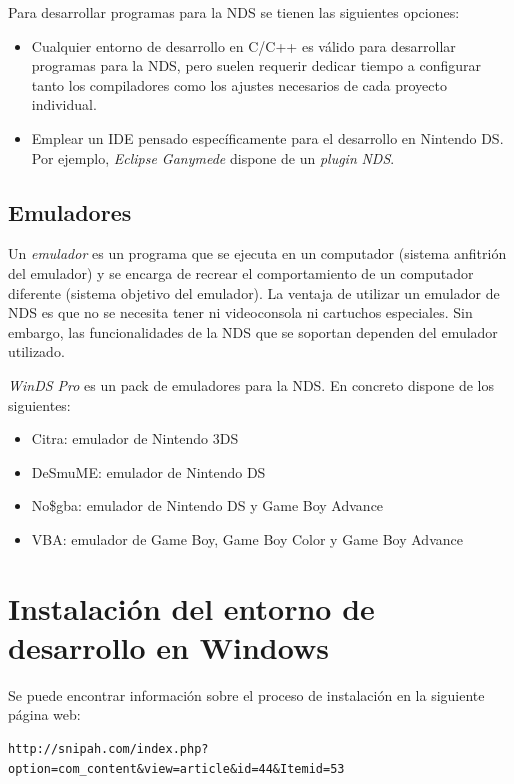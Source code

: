 Para desarrollar programas para la NDS se tienen las siguientes opciones:

\begin{itemize}
\item Cualquier entorno de desarrollo en C/C++ es válido para desarrollar programas para la NDS, pero suelen requerir dedicar tiempo a configurar tanto los compiladores como los ajustes necesarios de cada proyecto individual. 
%
\item Emplear un IDE pensado específicamente para el desarrollo en Nintendo DS. Por ejemplo, \textit{Eclipse Ganymede} dispone de un \textit{plugin} \textit{NDS}. 
\end{itemize}

\subsection{Emuladores}
Un \textit{emulador} es un programa que se ejecuta en un computador (sistema anfitrión del emulador) y se encarga de recrear el comportamiento de un computador diferente (sistema objetivo del emulador). La ventaja de utilizar un emulador de NDS es que no se necesita tener ni videoconsola ni cartuchos especiales. Sin embargo, las funcionalidades de la NDS que se soportan dependen del emulador utilizado. 

\textit{WinDS Pro} es un pack de emuladores para la NDS. En concreto dispone de los siguientes:
\begin{itemize}
\item Citra: emulador de Nintendo 3DS
\item DeSmuME: emulador de Nintendo DS
\item No\$gba: emulador de Nintendo DS y Game Boy Advance
\item VBA: emulador de Game Boy, Game Boy Color y Game Boy Advance
\end{itemize}

\section{Instalación del entorno de desarrollo en Windows}
Se puede encontrar información sobre el proceso de instalación en la siguiente página web:
\begin{verbatim}
http://snipah.com/index.php?option=com_content&view=article&id=44&Itemid=53
\end{verbatim}

